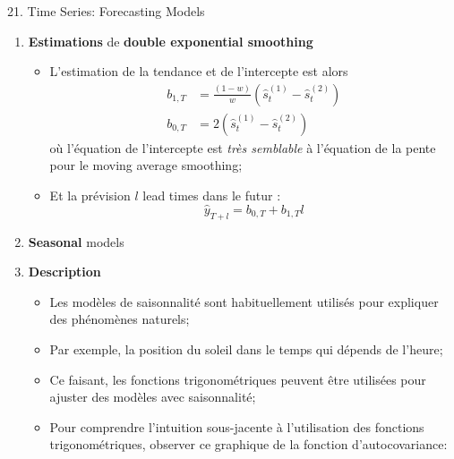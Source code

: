 \documentclass[12pt, titlepage, french]{report}
\begin{document}
\begin{CHPT_SUMM}[label = {timeseries21}]{21. Time Series: Forecasting Models}
\begin{enumerate}
\begin{enumerate}
		\item	Créer une \textbf{smoothed series} des valeurs $\hat{s}_{t}^{(1)}$ avec la formule simplifiée réécrite ci-dessous:
			\begin{equation*}
			\hat{s}_{t}^{(1)}	
				=	w \hat{s}^{(1)}_{t - 1} + (1 - w) y_{t}
			\end{equation*}
		\item	Pour	 créer une \textbf{doubly smoothed series}, utiliser l'étape précédente comme input:
			\begin{equation*}
			\hat{s}_{t}^{(2)}	
				=	w \hat{s}^{(2)}_{t - 1} + (1 - w) \hat{s}^{(1)}_{t}
			\end{equation*}
		\end{enumerate}
	\item[]	\textbf{Estimations} de \textbf{double exponential smoothing}
		\begin{itemize}
		\item	L'estimation de la tendance et de l'intercepte est alors
			\begin{align*}
			b_{1, T}	
				&=	\frac{(1 - w)}{w}\left(\hat{s}_{t}^{(1)} - \hat{s}_{t}^{(2)}\right)	\\
			b_{0, T}
				&=	2(\hat{s}_{t}^{(1)} - \hat{s}_{t}^{(2)})
			\end{align*}
			où l'équation de l'intercepte est \textit{très semblable} à l'équation de la pente pour le moving average smoothing;
		\item	Et la prévision $l$ lead times dans le futur :
			\begin{equation*}
			\hat{y}_{T + l}
				=	b_{0, T} + b_{1, T} l	
			\end{equation*}
		\end{itemize}
	\item	\textbf{Seasonal} models
	\item[]	\textbf{Description}
		\begin{itemize}
		\item	Les modèles de saisonnalité sont habituellement utilisés pour expliquer des phénomènes naturels;
		\item	Par exemple, la position du soleil dans le temps qui dépends de l'heure;
		\item	Ce faisant, les fonctions trigonométriques peuvent être utilisées pour ajuster des modèles avec saisonnalité;
		\item[]	Pour comprendre l'intuition sous-jacente à l'utilisation des fonctions trigonométriques, observer ce graphique de la fonction d'autocovariance:
		

\end{itemize}
\end{enumerate}
\end{CHPT_SUMM}
\end{document}
